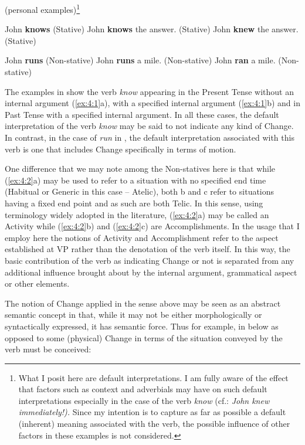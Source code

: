 \ea\label{ex:4:1} (personal examples)\footnote{What I posit here are
  default interpretations. I am fully aware of the effect that factors
  such as context and adverbials may have on such default
  interpretations especially in the case of the verb \textit{know} (cf.:
  \textit{John knew immediately!).} Since my intention is to capture
  as far as possible a default (inherent) meaning associated with the
  verb, the possible influence of other factors in these examples is
  not considered.}

\ea John \textbf{knows} (Stative) \ex John \textbf{knows} the answer.
(Stative) \ex John \textbf{knew} the answer. (Stative) \z \z

\ea%
\label{ex:4:2}
\ea John \textbf{runs} (Non-stative) \ex John \textbf{runs} a mile.
(Non-stative) \ex John \textbf{ran} a mile. (Non-stative) \z \z

The examples in  show the verb \textit{know} appearing in the
Present Tense without an internal argument (\ref{ex:4:1}a), with a
specified internal argument (\ref{ex:4:1}b) and in Past Tense with a
specified internal argument.  In all these cases, the default
interpretation of the verb \textit{know} may be said to not indicate any kind
of Change.  In contrast, in the case of \textit{run} in , the
default interpretation associated with this verb is one that includes
Change specifically in terms of motion.

One difference that we may note among the Non-statives here is that
while (\ref{ex:4:2}a) may be used to refer to a situation with no
specified end time (Habitual or Generic in this case -- Atelic), both b
and c refer to situations having a fixed end point and as such are
both Telic.  In this sense, using  terminology
widely adopted in the literature, (\ref{ex:4:2}a) may be called an
Activity while (\ref{ex:4:2}b) and (\ref{ex:4:2}c) are
Accomplishments.  In the usage that I employ here the notions of
Activity and Accomplishment refer to the aspect established at VP
rather than the denotation of the verb itself.  In this way, the basic
contribution of the verb as indicating Change or not is separated from
any additional influence brought about by the internal argument,
grammatical aspect or other elements.

The notion of Change applied in the sense above may be seen as an
abstract semantic concept in that, while it may not be either
morphologically or syntactically expressed, it has semantic force.
Thus for example, in  below as opposed to 
some (physical) Change in terms of the situation conveyed by the verb
must be conceived:

